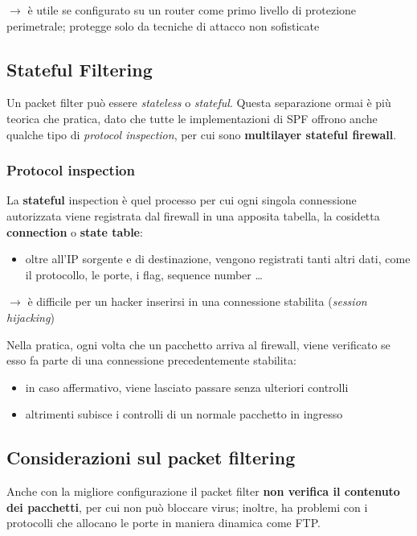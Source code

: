 \noindent $\rightarrow$ è utile se configurato su un router come primo livello di protezione perimetrale; protegge solo da 
tecniche di attacco non sofisticate

\subsection{Stateful Filtering}
Un packet filter può essere \textit{stateless} o \textit{stateful}. Questa separazione 
ormai è più teorica che pratica, dato che tutte le implementazioni di SPF offrono anche qualche tipo 
di \textit{protocol inspection}, per cui sono \textbf{multilayer stateful firewall}.

\subsubsection{Protocol inspection}
La \textbf{stateful} inspection è quel processo per cui ogni singola connessione autorizzata 
viene registrata dal firewall in una apposita tabella, la cosidetta \textbf{connection} o \textbf{state table}:
\begin{itemize}
    \item oltre all'IP sorgente e di destinazione, vengono registrati tanti altri dati, come 
    il protocollo, le porte, i flag, sequence number \dots
\end{itemize}

$\rightarrow$ è difficile per un hacker inserirsi in una connessione stabilita (\textit{session hijacking})

\noindent Nella pratica, ogni volta che un pacchetto arriva al firewall, viene verificato 
se esso fa parte di una connessione precedentemente stabilita:
\begin{itemize}
    \item in caso affermativo, viene lasciato passare senza ulteriori controlli 
    \item altrimenti subisce i controlli di un normale pacchetto in ingresso
\end{itemize}

\subsection{Considerazioni sul packet filtering}
Anche con la migliore configurazione il packet filter \textbf{non verifica 
il contenuto dei pacchetti}, per cui non può bloccare virus; inoltre, ha problemi
con i protocolli che allocano le porte in maniera dinamica come FTP.

